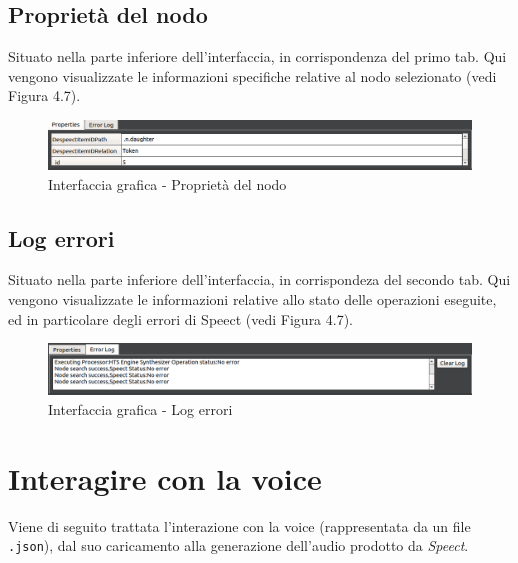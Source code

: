 \documentclass[openany,12pt,a4paper]{report}
\begin{document}
 	\newpage
 	
 	\subsection{Proprietà del nodo}
 	Situato nella parte inferiore dell'interfaccia, in corrispondenza del primo tab. Qui vengono visualizzate le informazioni specifiche relative al nodo selezionato (vedi Figura 4.7).
 		\begin{figure}[H]
 			
 			\centering
 			
 				\includegraphics[width=\textwidth]{./img/node-properties}
 			
 			\caption{Interfaccia grafica - Proprietà del nodo}
 			
 		\end{figure}
 	
 	\subsection{Log errori}
 	Situato nella parte inferiore dell'interfaccia, in corrispondeza del secondo tab. Qui vengono visualizzate le informazioni relative allo stato delle operazioni eseguite, ed in particolare degli errori di Speect (vedi Figura 4.7).
 	\begin{figure}[H]
 		
 		\centering
 		
 		\includegraphics[width=\textwidth]{./img/error-log}
 		
 		\caption{Interfaccia grafica - Log errori}
 		
 	\end{figure}
	
	\section{Interagire con la voice}
	Viene di seguito trattata l'interazione con la voice (rappresentata da un file \verb|.json|), dal suo caricamento alla generazione dell'audio prodotto da \textit{Speect}.
	
\end{document}
